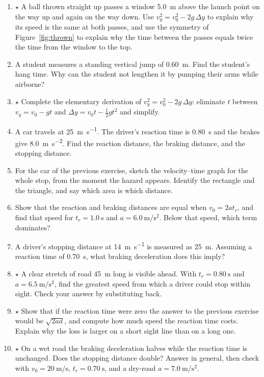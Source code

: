 \documentclass[11pt,twoside,openany]{book}
\newcounter{check}[chapter]
\begin{document}
\begin{enumerate}[label=\textbf{\thechapter.\arabic*},resume=exercises,leftmargin=*]
  \item $\star$ A ball thrown straight up passes a window \SI{5.0}{\metre} above the launch point on the way up and again on the way down. Use $v_y^2 = v_0^2 - 2g\,\Delta y$ to explain why its speed is the same at both passes, and use the symmetry of Figure~\ref{fig:thrown} to explain why the time between the passes equals twice the time from the window to the top.
  \item A student measures a standing vertical jump of \SI{0.60}{\metre}. Find the student's hang time. Why can the student not lengthen it by pumping their arms while airborne?
  \item $\star$ Complete the elementary derivation of $v_y^2 = v_0^2 - 2g\,\Delta y$: eliminate $t$ between $v_y = v_0 - gt$ and $\Delta y = v_0 t - \tfrac12 g t^2$ and simplify.\label{ex:elimt}
  \item A car travels at \SI{25}{\metre\per\second}. The driver's reaction time is \SI{0.80}{\second} and the brakes give \SI{8.0}{\metre\per\second\squared}. Find the reaction distance, the braking distance, and the stopping distance.
  \item For the car of the previous exercise, sketch the velocity--time graph for the whole stop, from the moment the hazard appears. Identify the rectangle and the triangle, and say which area is which distance.
  \item Show that the reaction and braking distances are equal when $v_0 = 2at_r$, and find that speed for $t_r = \SI{1.0}{\second}$ and $a = \SI{6.0}{\metre\per\second\squared}$. Below that speed, which term dominates?
  \item A driver's stopping distance at \SI{14}{\metre\per\second} is measured as \SI{25}{\metre}. Assuming a reaction time of \SI{0.70}{\second}, what braking deceleration does this imply?
  \item $\star$ A clear stretch of road \SI{45}{\metre} long is visible ahead. With $t_r = \SI{0.80}{\second}$ and $a = \SI{6.5}{\metre\per\second\squared}$, find the greatest speed from which a driver could stop within sight. Check your answer by substituting back.\label{ex:sightline}
  \item $\star$ Show that if the reaction time were zero the answer to the previous exercise would be $\sqrt{2ad}$, and compute how much speed the reaction time costs. Explain why the loss is larger on a short sight line than on a long one.
  \item $\star$ On a wet road the braking deceleration halves while the reaction time is unchanged. Does the stopping distance double? Answer in general, then check with $v_0 = \SI{20}{\metre\per\second}$, $t_r = \SI{0.70}{\second}$, and a dry-road $a = \SI{7.0}{\metre\per\second\squared}$.
\end{enumerate}
\end{document}
